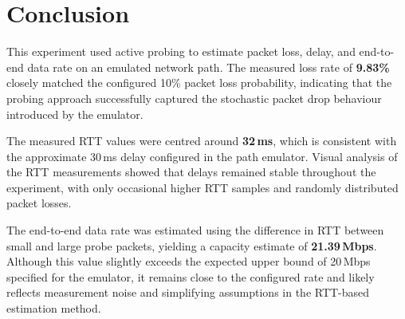\section{Conclusion}

This experiment used active probing to estimate packet loss, delay, and end-to-end data rate on an emulated network path. The measured loss rate of \textbf{9.83\%} closely matched the configured 10\% packet loss probability, indicating that the probing approach successfully captured the stochastic packet drop behaviour introduced by the emulator.

The measured RTT values were centred around \textbf{32\,ms}, which is consistent with the approximate 30\,ms delay configured in the path emulator. Visual analysis of the RTT measurements showed that delays remained stable throughout the experiment, with only occasional higher RTT samples and randomly distributed packet losses.

The end-to-end data rate was estimated using the difference in RTT between small and large probe packets, yielding a capacity estimate of \textbf{21.39\,Mbps}. Although this value slightly exceeds the expected upper bound of 20\,Mbps specified for the emulator, it remains close to the configured rate and likely reflects measurement noise and simplifying assumptions in the RTT-based estimation method.